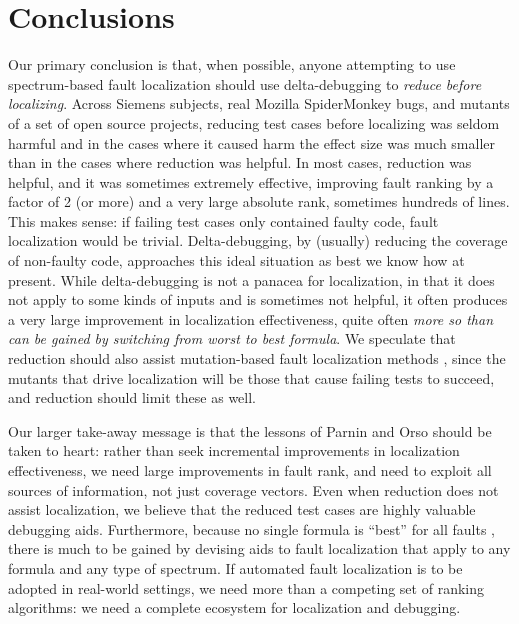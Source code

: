 \section{Conclusions}

Our primary conclusion is that, when possible, anyone attempting to
use spectrum-based fault localization should use delta-debugging to
\emph{reduce before localizing}.  Across Siemens subjects, real
Mozilla SpiderMonkey bugs, and mutants of a set of open source
projects, reducing test cases before localizing was seldom harmful and
in the cases where it caused harm the effect size was much smaller
than in the cases where reduction was helpful.  In most cases,
reduction was helpful, and it was sometimes extremely effective,
improving fault ranking by a factor of 2 (or more) and a very large
absolute rank, sometimes hundreds of lines. This makes sense: if
failing test cases only contained faulty code, fault localization
would be trivial.  Delta-debugging, by (usually) reducing the coverage
of non-faulty code, approaches this ideal situation as best we know
how at present.  While delta-debugging is not a panacea for
localization, in that it does not apply to some kinds of inputs and is
sometimes not helpful, it often produces a very large improvement in
localization effectiveness, quite often \emph{more so than can be
gained by switching from worst to best formula}.  We speculate that
reduction should also assist mutation-based fault localization methods
\cite{MUSE,multilingual,compilemutant}, since the mutants
that drive localization will be those that cause failing tests to
succeed, and reduction should limit these as well.

Our larger take-away message is that the lessons of Parnin and Orso
\cite{AutoHelp} should be taken to heart: rather than seek incremental
improvements in localization effectiveness, we need large improvements
in fault rank, and need to exploit all sources of information, not
just coverage vectors.  Even when reduction does not assist
localization, we believe that the reduced test cases are highly
valuable debugging aids.  Furthermore, because no single formula is
``best'' for all faults \cite{yoo2014no}, there is much to be gained
by devising aids to fault localization that apply to any formula and
any type of spectrum.  If automated fault localization is to be
adopted in real-world settings, we need more than a competing set of
ranking algorithms: we need a complete ecosystem for localization and debugging.
